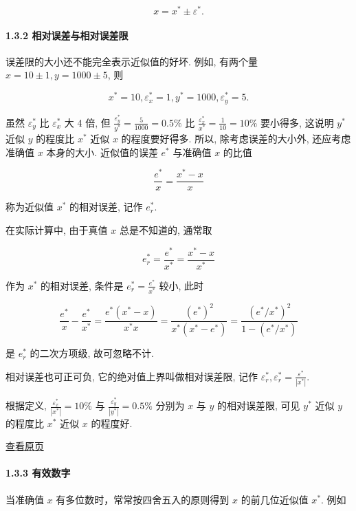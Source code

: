 \documentclass[
  10pt,
  fontset=fandol]{ctexart}
\begin{document}
\[
x = x^* \pm \varepsilon^*.
\]

\paragraph{1.3.2 相对误差与相对误差限}\label{ux76f8ux5bf9ux8befux5deeux4e0eux76f8ux5bf9ux8befux5deeux9650}

误差限的大小还不能完全表示近似值的好坏. 例如, 有两个量 \(x = 10 \pm 1, y = 1000 \pm 5\), 则

\[
x^* = 10, \varepsilon_x^* = 1, y^* = 1000, \varepsilon_y^* = 5.
\]

虽然 \(\varepsilon_y^*\) 比 \(\varepsilon_x^*\) 大 4 倍, 但 \(\frac{\varepsilon_y^*}{y^*} = \frac{5}{1000} = 0.5\%\) 比 \(\frac{\varepsilon_x^*}{x^*} = \frac{1}{10} = 10\%\) 要小得多, 这说明 \(y^*\) 近似 \(y\) 的程度比 \(x^*\) 近似 \(x\) 的程度要好得多. 所以, 除考虑误差的大小外, 还应考虑准确值 \(x\) 本身的大小. 近似值的误差 \(e^*\) 与准确值 \(x\) 的比值

\[
\frac{e^*}{x} = \frac{x^* - x}{x}
\]

称为近似值 \(x^*\) 的相对误差, 记作 \(e_r^*\).

在实际计算中, 由于真值 \(x\) 总是不知道的, 通常取

\[
e_r^* = \frac{e^*}{x^*} = \frac{x^* - x}{x^*}
\]

作为 \(x^*\) 的相对误差, 条件是 \(e_r^* = \frac{e^*}{x^*}\) 较小, 此时

\[
\frac{e^*}{x} - \frac{e^*}{x^*} = \frac{e^* (x^* - x)}{x^* x} = \frac{(e^*)^2}{x^* (x^* - e^*)} = \frac{(e^* / x^*)^2}{1 - (e^* / x^*)}
\]

是 \(e_r^*\) 的二次方项级, 故可忽略不计.

相对误差也可正可负, 它的绝对值上界叫做相对误差限, 记作 \(\varepsilon_r^*, \varepsilon_r^* = \frac{\varepsilon^*}{|x^*|}\).

根据定义, \(\frac{\varepsilon_x^*}{|x^*|} = 10\%\) 与 \(\frac{\varepsilon_y^*}{|y^*|} = 0.5\%\) 分别为 \(x\) 与 \(y\) 的相对误差限, 可见 \(y^*\) 近似 \(y\) 的程度比 \(x^*\) 近似 \(x\) 的程度好.

\href{../../source-images/pdf-019.jpeg}{查看原页}

\paragraph{1.3.3 有效数字}\label{ux6709ux6548ux6570ux5b57}

当准确值 \(x\) 有多位数时，常常按四舍五入的原则得到 \(x\) 的前几位近似值 \(x^*\). 例如
\end{document}
